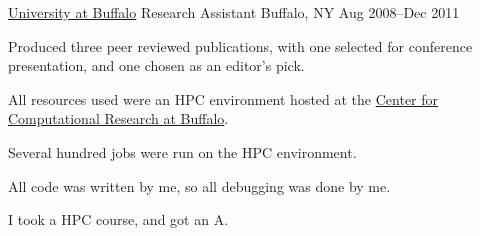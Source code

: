 \begin{cventries}
  \cventry
    {\href{www.buffalo.edu}{University at Buffalo}}
    {Research Assistant}
    {Buffalo, NY} {Aug 2008--Dec 2011}
    {
    \begin{cvitems}
	  \item {Produced three peer reviewed publications,
             with one selected for conference presentation,
             and one chosen as an editor's pick.}
     \item All resources used were an HPC environment hosted at the \href{https://ccr.buffalo.edu}{Center for Computational Research at Buffalo}.
     \item Several hundred jobs were run on the HPC environment.
     \item All code was written by me, so all debugging was done by me.
     \item I took a HPC course, and got an A.
    \end{cvitems}
    }


\end{cventries}


